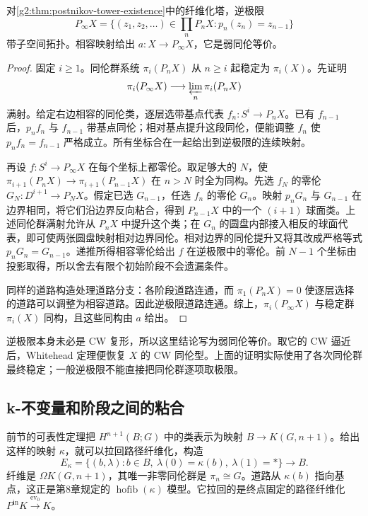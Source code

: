 \begin{proposition}\label{g2:prop:postnikov-limit}
	对\cref{g2:thm:postnikov-tower-existence}中的纤维化塔，逆极限
	\[
		P_\infty X=\{(z_1,z_2,\ldots)\in\textstyle\prod_nP_nX:p_n(z_n)=z_{n-1}\}
	\]
	带子空间拓扑。相容映射给出 \(a:X\to P_\infty X\)，它是弱同伦等价。
\end{proposition}
\begin{proof}
	固定 \(i\ge1\)。同伦群系统 \(\pi_i(P_nX)\) 从 \(n\ge i\) 起稳定为 \(\pi_i(X)\)。先证明
	\[
		\pi_i(P_\infty X)\longrightarrow\varprojlim_n\pi_i(P_nX)
	\]
	满射。给定右边相容的同伦类，逐层选带基点代表 \(f_n:S^i\to P_nX\)。已有 \(f_{n-1}\) 后，\(p_nf_n\) 与 \(f_{n-1}\) 带基点同伦；相对基点提升这段同伦，便能调整 \(f_n\) 使 \(p_nf_n=f_{n-1}\) 严格成立。所有坐标合在一起给出到逆极限的连续映射。

	再设 \(f:S^i\to P_\infty X\) 在每个坐标上都零伦。取足够大的 \(N\)，使 \(\pi_{i+1}(P_nX)\to\pi_{i+1}(P_{n-1}X)\) 在 \(n>N\) 时全为同构。先选 \(f_N\) 的零伦 \(G_N:D^{i+1}\to P_NX\)。假定已选 \(G_{n-1}\)，任选 \(f_n\) 的零伦 \(G_n\)。映射 \(p_nG_n\) 与 \(G_{n-1}\) 在边界相同，将它们沿边界反向粘合，得到 \(P_{n-1}X\) 中的一个 \((i+1)\) 球面类。上述同伦群满射允许从 \(P_nX\) 中提升这个类；在 \(G_n\) 的圆盘内部接入相反的球面代表，即可使两张圆盘映射相对边界同伦。相对边界的同伦提升又将其改成严格等式 \(p_nG_n=G_{n-1}\)。递推所得相容零伦给出 \(f\) 在逆极限中的零伦。前 \(N-1\) 个坐标由投影取得，所以舍去有限个初始阶段不会遗漏条件。

	同样的道路构造处理道路分支：各阶段道路连通，而 \(\pi_1(P_nX)=0\) 使逐层选择的道路可以调整为相容道路。因此逆极限道路连通。综上，\(\pi_i(P_\infty X)\) 与稳定群 \(\pi_i(X)\) 同构，且这些同构由 \(a\) 给出。
\end{proof}

逆极限本身未必是 CW 复形，所以这里结论写为弱同伦等价。取它的 CW 逼近后，Whitehead 定理便恢复 \(X\) 的 CW 同伦型。上面的证明实际使用了各次同伦群最终稳定；一般逆极限不能直接把同伦群逐项取极限。

\subsection{k-不变量和阶段之间的粘合}
\label{g2:subsec:1203:03}

前节的可表性定理把 \(H^{n+1}(B;G)\) 中的类表示为映射 \(B\to K(G,n+1)\)。给出这样的映射 \(\kappa\)，就可以拉回路径纤维化，构造
\begin{equation}\label{g2:eq:k-invariant-path-model}
	E_\kappa=\{(b,\lambda):b\in B,\ \lambda(0)=\kappa(b),\ \lambda(1)=*\}
	\longrightarrow B.
\end{equation}
纤维是 \(\Omega K(G,n+1)\)，其唯一非零同伦群是 \(\pi_n\cong G\)。道路从 \(\kappa(b)\) 指向基点，这正是第8章规定的 \(\operatorname{hofib}(\kappa)\) 模型。它拉回的是终点固定的路径纤维化 \(P^{\mathrm{in}}K\xrightarrow{\operatorname{ev}_0}K\)。

